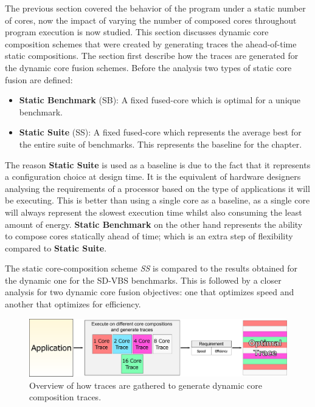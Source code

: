 The previous section covered the behavior of the program under a static number of cores, now the impact of varying the number of composed cores throughout program execution is now studied.
This section discusses dynamic core composition schemes that were created by generating traces the ahead-of-time static compositions.
The section first describe how the traces are generated for the dynamic core fusion schemes.
Before the analysis two types of static core fusion are defined:

\begin{itemize}
	\item \textbf{Static Benchmark} (SB): A fixed fused-core which is optimal for a unique benchmark.
\vspace{-1.2em}
	\item \textbf{Static Suite} (SS): A fixed fused-core which represents the average best for the entire suite of benchmarks. This represents the baseline for the chapter.
\end{itemize}

The reason \textbf{Static Suite} is used as a baseline is due to the fact that it represents a configuration choice at design time.
It is the equivalent of hardware designers analysing the requirements of a processor based on the type of applications it will be executing.
This is better than using a single core as a baseline, as a single core will always represent the slowest execution time whilst also consuming the least amount of energy.
\textbf{Static Benchmark} on the other hand represents the ability to compose cores statically ahead of time; which is an extra step of flexibility compared to \textbf{Static Suite}.

The static core-composition scheme \textit{SS} is compared to the results obtained for the dynamic one for the SD-VBS benchmarks.
This is followed by a closer analysis for two dynamic core fusion objectives: one that optimizes speed and another that optimizes for efficiency.

\begin{figure}[t]
    \centering
	\includegraphics[width=1\textwidth]{cases-paper/graphics/exploration/trace-gathering.pdf}
    \caption{Overview of how traces are gathered to generate dynamic core composition traces.}
    \label{fig:tracegraph}
	\vspace{1em}
\end{figure}

